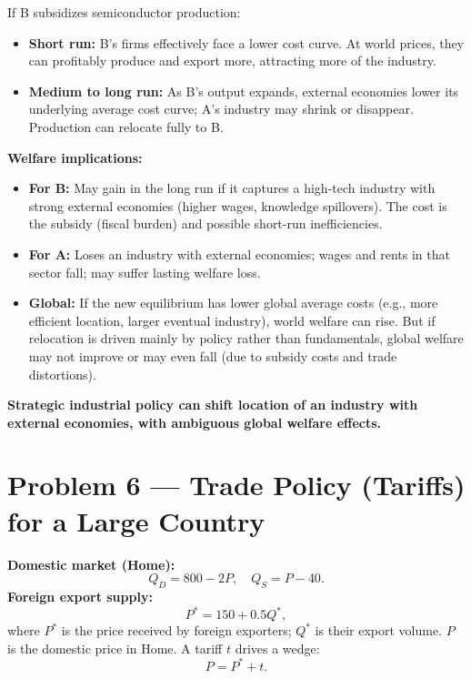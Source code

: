 \documentclass[12pt]{article}
\begin{document}
\begin{enumerate}[label=(\arabic*)]
If B subsidizes semiconductor production:
\begin{itemize}
\item \textbf{Short run:}  
  B's firms effectively face a lower cost curve. At world prices, they can profitably produce and export more, attracting more of the industry.
\item \textbf{Medium to long run:}  
  As B’s output expands, external economies lower its underlying average cost curve; A’s industry may shrink or disappear. Production can relocate fully to B.
\end{itemize}

\textbf{Welfare implications:}
\begin{itemize}
\item \textbf{For B:}  
  May gain in the long run if it captures a high-tech industry with strong external economies (higher wages, knowledge spillovers). The cost is the subsidy (fiscal burden) and possible short-run inefficiencies.
\item \textbf{For A:}  
  Loses an industry with external economies; wages and rents in that sector fall; may suffer lasting welfare loss.
\item \textbf{Global:}  
  If the new equilibrium has lower global average costs (e.g., more efficient location, larger eventual industry), world welfare can rise. But if relocation is driven mainly by policy rather than fundamentals, global welfare may not improve or may even fall (due to subsidy costs and trade distortions).
\end{itemize}

\textbf{Strategic industrial policy can shift location of an industry with external economies, with ambiguous global welfare effects.}


\end{enumerate}
\newpage
\section*{Problem 6 — Trade Policy (Tariffs) for a Large Country}

\textbf{Domestic market (Home):}
\[
Q_D = 800 - 2P, \quad Q_S = P - 40.
\]
\textbf{Foreign export supply:}
\[
P^* = 150 + 0.5Q^*,
\]
where $P^*$ is the price received by foreign exporters; $Q^*$ is their export volume.  
$P$ is the domestic price in Home. A tariff $t$ drives a wedge:
\[
P = P^* + t.
\]
\end{document}
